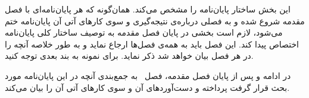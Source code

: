 
این بخش ساختار پایان‌نامه را مشخص می‌کند. همان‌گونه که هر پایان‌نامه‌ای با فصل مقدمه شروع شده و به فصلی درباره‌ی نتیجه‌گیری و سوی کارهای آتی آن پایان‌نامه ختم می‌شود، لازم است بخشی در پایان فصل مقدمه به توصیف ساختار کلی پایان‌نامه اختصاص پیدا کند.
این فصل باید به همه‌ی فصل‌ها ارجاع نماید و به طور خلاصه آنچه را در هر فصل بیان خواهد شد ذکر نماید. برای نمونه به بند بعدی توجه کنید.

در ادامه و پس از پایان فصل مقدمه، فصل~ به جمع‌بندی آنچه در  این  پایان‌نامه مورد بحث قرار گرفت پرداخته و دست‌آوردهای آن و سوی کارهای آتی آن را بیان  می‌کند.
